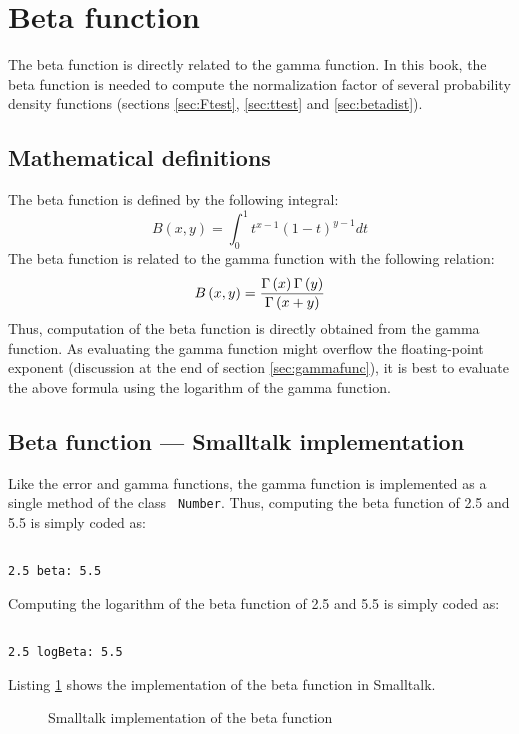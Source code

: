 \documentclass[twoside]{book}
\begin{document}
\section{Beta function}
\label{sec:betafunc} The beta function is directly related to the
gamma function. In this book, the beta function is needed to
compute the normalization factor of several probability density
functions (\cf sections \ref{sec:Ftest}, \ref{sec:ttest} and
\ref{sec:betadist}).
\subsection{Mathematical definitions}
The beta function is defined by the following integral:
\begin{equation}
\label{eq:betaint} B\left(x,y\right)=\int_0^1
t^{x-1}\left(1-t\right)^{y-1}dt
\end{equation}
The beta function is related to the gamma function with the
following relation:
\begin{equation}
B\left(x,y\right)={\Gamma\left(x\right)\Gamma\left(y\right)\over\Gamma\left(x+y\right)}
\end{equation}
Thus, computation of the beta function is directly obtained from
the gamma function. As evaluating the gamma function might
overflow the floating-point exponent (\cf discussion at the end of
section \ref{sec:gammafunc}), it is best to evaluate the above
formula using the logarithm of the gamma function.

\subsection{Beta function --- Smalltalk implementation}
 Like the error and gamma functions, the
gamma function is implemented as a single method of the class {\tt
Number}. Thus, computing the beta function of 2.5 and 5.5 is
simply coded as:
\begin{codeExample}
\begin{verbatim}

2.5 beta: 5.5
\end{verbatim}
\end{codeExample} Computing the logarithm of the beta function of
2.5 and 5.5 is simply coded as:
\begin{codeExample}
\begin{verbatim}

2.5 logBeta: 5.5
\end{verbatim}
\end{codeExample}
Listing \ref{ls:betafunc} shows the
implementation of the beta function in Smalltalk.
\begin{figure}
\begin{listing}
\caption{Smalltalk implementation of the beta function}
\label{ls:betafunc}

\end{listing}
\end{figure}
\end{document}
